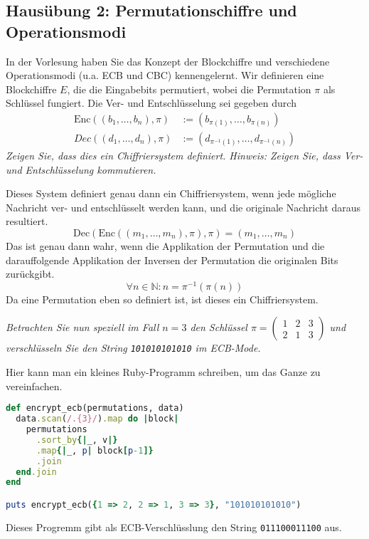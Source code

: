 \documentclass[
  ngerman,
  DIV=12
]{scrartcl}
\begin{document}
\subsection*{Hausübung 2: Permutationschiffre und Operationsmodi}

In der Vorlesung haben Sie das Konzept der Blockchiffre und verschiedene Operationsmodi (u.a. ECB und CBC) kennengelernt. Wir definieren eine Blockchiffre $E$, die die Eingabebits permutiert, wobei die Permutation $\pi$ als Schlüssel fungiert. Die Ver- und Entschlüsselung sei gegeben durch
\begin{align*}
\mathrm{Enc}((b_1,\dots,b_n),\pi) &:= (b_{\pi(1)},\dots,b_{\pi(n)})\\
Dec((d_1,\dots,d_n),\pi) &:= (d_{\pi^{-1}(1)},\dots,d_{\pi^{-1}(n)})  
\end{align*}
\emph{Zeigen Sie, dass dies ein Chiffriersystem definiert. Hinweis: Zeigen Sie, dass Ver- und Entschlüsselung kommutieren.}

\medskip\noindent
Dieses System definiert genau dann ein Chiffriersystem, wenn jede mögliche Nachricht ver- und entschlüsselt werden kann, und die originale Nachricht daraus resultiert.
\begin{equation*}
\mathrm{Dec}(\mathrm{Enc}((m_1, \dots, m_n), \pi), \pi) = (m_1, \dots, m_n)
\end{equation*}
Das ist genau dann wahr, wenn die Applikation der Permutation und die darauffolgende Applikation der Inversen der Permutation die originalen Bits zurückgibt. 
\begin{equation*}
\forall n \in \mathbb{N} : n = \pi^{-1}(\pi(n))  
\end{equation*}
Da eine Permutation eben so definiert ist, ist dieses ein Chiffriersystem.

\bigskip\noindent
\emph{Betrachten Sie nun speziell im Fall $n = 3$ den Schlüssel $\pi = \begin{pmatrix}1&2&3\\2&1&3\end{pmatrix}$ und verschlüsseln Sie den String \texttt{101010101010} im ECB-Mode.}

\medskip\noindent
Hier kann man ein kleines Ruby-Programm schreiben, um das Ganze zu vereinfachen.
\begin{lstlisting}[language=ruby]
def encrypt_ecb(permutations, data)
  data.scan(/.{3}/).map do |block|
    permutations
      .sort_by{|_, v|}
      .map{|_, p| block[p-1]}
      .join
  end.join
end

puts encrypt_ecb({1 => 2, 2 => 1, 3 => 3}, "101010101010")
\end{lstlisting}
Dieses Progremm gibt als ECB-Verschlüsslung den String \verb|011100011100| aus.
\end{document}
